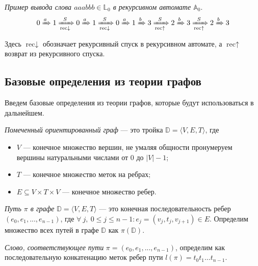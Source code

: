 \begin{ruexample}
    \emph{Пример вывода слова $aaabbb \in \mathbb{L}_0$ в рекурсивном автомате $\mathbb{A}_0$}.
    $$0 \xRightarrow[]{a} 1 \xRightarrow[\text{rec}\downarrow]{S} 0 \xRightarrow[]{a} 1 \xRightarrow[\text{rec}\downarrow]{S} 0 \xRightarrow[]{a} 1 \xRightarrow[]{b} 3 \xRightarrow[\text{rec}\uparrow]{S} 2 \xRightarrow[]{b} 3 \xRightarrow[\text{rec}\uparrow]{S} 2 \xRightarrow[]{b} 3$$

    Здесь $\text{rec}\downarrow$ обозначает рекурсивный спуск в рекурсивном автомате, а $\text{rec}\uparrow$ возврат из рекурсивного спуска.
\end{ruexample}


\subsection{Базовые определения из теории графов}

Введем базовые определения из теории графов, которые будут использоваться в дальнейшем.

\begin{rudefinition} \emph{Помеченный ориентированный граф} --- это тройка $\mathbb{D} = \langle V, E, T \rangle$, где
\begin{itemize}
    \item $V$ --- конечное множество вершин, не умаляя общности пронумеруем вершины натуральными числами от $0$ до $|V|-1$;
    \item $T$ --- конечное множество меток на ребрах;
    \item $E \subseteq V \times T \times V$ --- конечное множество ребер.
\end{itemize}
\end{rudefinition}

\begin{rudefinition}
 \emph{Путь $\pi$ в графе} $\mathbb{D} = \langle V, E, T \rangle$ --- это конечная последовательность ребер $(e_0, e_1, ..., e_{n-1})$, где $\forall~ j,~ 0 \leq j \leq n - 1: e_j=(v_j,t_j,v_{j+1}) \in E$.
Определим множество всех путей в графе $\mathbb{D}$ как $\pi(\mathbb{D})$.
\end{rudefinition}

\begin{rudefinition}
    \emph{Слово, соответствующее пути} $\pi = (e_0, e_1, ..., e_{n-1})$, определим как последовательную конкатенацию меток ребер пути $l(\pi) = t_0 t_1 \dots t_{n - 1}$.
\end{rudefinition}

